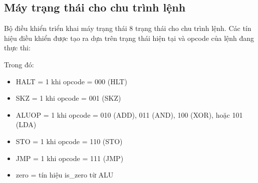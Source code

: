 \subsection{Máy trạng thái cho chu trình lệnh}

Bộ điều khiển triển khai máy trạng thái 8 trạng thái cho chu trình lệnh. Các tín hiệu điều khiển được tạo ra dựa trên trạng thái hiện tại và opcode của lệnh đang thực thi:

\begin{table}[h]
\centering
{}
\caption{Máy trạng thái của Controller}
\label{tab:state_machine}
\end{table}

Trong đó:
\begin{itemize}
    \item HALT = 1 khi opcode = 000 (HLT)
    \item SKZ = 1 khi opcode = 001 (SKZ)
    \item ALUOP = 1 khi opcode = 010 (ADD), 011 (AND), 100 (XOR), hoặc 101 (LDA)
    \item STO = 1 khi opcode = 110 (STO)
    \item JMP = 1 khi opcode = 111 (JMP)
    \item zero = tín hiệu is\_zero từ ALU
\end{itemize}

